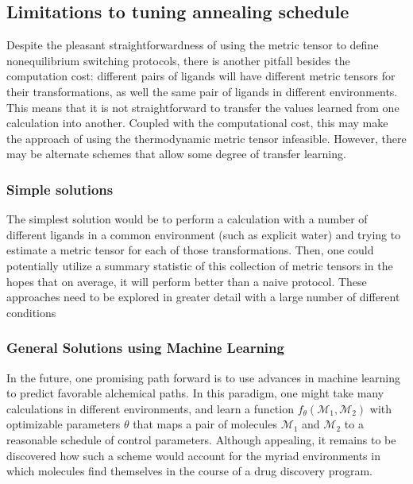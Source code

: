 \subsection{Limitations to tuning annealing schedule}
%
Despite the pleasant straightforwardness of using the metric tensor to define nonequilibrium switching protocols, there is another pitfall besides the computation cost: different pairs of ligands will have different metric tensors for their transformations, as well the same pair of ligands in different environments.
%
This means that it is not straightforward to transfer the values learned from one calculation into another.
%
Coupled with the computational cost, this may make the approach of using the thermodynamic metric tensor infeasible.
%
However, there may be alternate schemes that allow some degree of transfer learning.
%
\subsubsection{Simple solutions}
%
The simplest solution would be to perform a calculation with a number of different ligands in a common environment (such as explicit water) and trying to estimate a metric tensor for each of those transformations.
%
Then, one could potentially utilize a summary statistic of this collection of metric tensors in the hopes that on average, it will perform better than a naive protocol.
%
These approaches need to be explored in greater detail with a large number of different conditions
%
\subsubsection{General Solutions using Machine Learning}
%
In the future, one promising path forward is to use advances in machine learning to predict favorable alchemical paths.
%
In this paradigm, one might take many calculations in different environments, and learn a function $f_{\theta}(\mathcal{M}_1, \mathcal{M}_2)$ with optimizable parameters $\theta$ that maps a pair of molecules $\mathcal{M}_1$ and $\mathcal{M}_2$ to a reasonable schedule of control parameters.
%
Although appealing, it remains to be discovered how such a scheme would account for the myriad environments in which molecules find themselves in the course of a drug discovery program.
%
%
